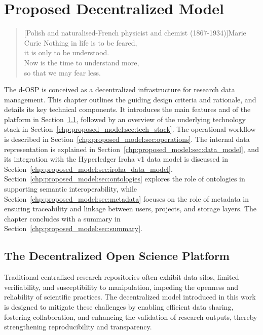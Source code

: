 \documentclass[final]{rc-book-2.14}
\begin{document}
\chapter{Proposed Decentralized Model}
\label{chp:proposed_model}

\begin{quotation}[Polish and naturalised-French physicist and chemist (1867-1934)]{Marie Curie}
    Nothing in life is to be feared, \\
    it is only to be understood. \\
    Now is the time to understand more, \\
    so that we may fear less.
\end{quotation}


\drop The d-OSP is conceived as a decentralized infrastructure for research data management. This chapter outlines the guiding design criteria and rationale, and details its key technical components. It introduces the main features and of the platform in Section~\ref{chp:proposed_model:sec:osp}, followed by an overview of the underlying technology stack in Section~\ref{chp:proposed_model:sec:tech_stack}. The operational workflow is described in Section~\ref{chp:proposed_model:sec:operations}. The internal data representation is explained in Section~\ref{chp:proposed_model:sec:data_model}, and its integration with the Hyperledger Iroha v1 data model is discussed in Section~\ref{chp:proposed_model:sec:iroha_data_model}. Section~\ref{chp:proposed_model:sec:ontologies} explores the role of ontologies in supporting semantic interoperability, while Section~\ref{chp:proposed_model:sec:metadata} focuses on the role of metadata in ensuring traceability and linkage between users, projects, and storage layers. The chapter concludes with a summary in Section~\ref{chp:proposed_model:sec:summary}.

\newpage

\section{The Decentralized Open Science Platform}
\label{chp:proposed_model:sec:osp}

Traditional centralized research repositories often exhibit data silos, limited verifiability, and susceptibility to manipulation, impeding the openness and reliability of scientific practices. The decentralized model introduced in this work is designed to mitigate these challenges by enabling efficient data sharing, fostering collaboration, and enhancing the validation of research outputs, thereby strengthening reproducibility and transparency.
\end{document}
